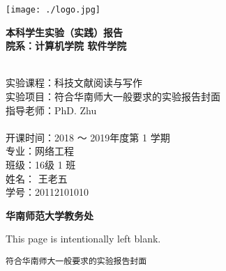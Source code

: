 \documentclass[10.5pt,a4paper,headings]{ctexart}
\newcommand{\titleline}[1]{\hspace*{6em} #1 \\}
\newcommand*{\blankpage}{%
\vspace*{\fill}
{\centering\fontsize{32pt}{64pt} This page is intentionally left blank.\par}
\vspace{\fill}}
\begin{document}
\begin{titlepage}
\scshape


\begin{center}
\vspace*{0.6cm}
\texttt{[image: ./logo.jpg]}

\doublespacing
\fontsize{18pt}{2em}\bf 
本科学生实验（实践）报告\\
\vspace{1em}
院系：计算机学院 
\hspace{2ex}
软件学院
\end{center}

\begin{flushleft}

\setlength{\parindent}{2em}
\bf
{\fontsize{14pt}{18pt}

\linespread{1.5}\selectfont
~\\
\titleline{实验课程：科技文献阅读与写作}

\titleline{实验项目：符合华南师大一般要求的实验报告封面}

\titleline{指导老师：PhD. Zhu}
~\\
\titleline{开课时间：2018 ～ 2019年度第 1 学期}

\titleline{专\hspace{2em}业：网络工程}

\titleline{班\hspace{2em}级：16级 1 班}

\titleline{姓\hspace{2em}名： 王老五}

\titleline{学\hspace{2em}号：20112101010}
}
\end{flushleft}

\begin{center}
\vspace{3cm}
\fontsize{14pt}{21pt}
\bf 华南师范大学教务处
\end{center}

\end{titlepage}

\blankpage
\newpage
\tableofcontents

\newpage

\begin{center}
\tt 符合华南师大一般要求的实验报告封面
\end{center}

\setlength{\parindent}{2em}
\end{document}
